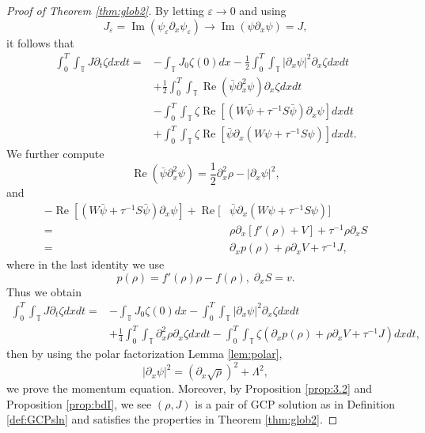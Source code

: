 \documentclass[leqno]{amsart}
\theoremstyle{plain}
\theoremstyle{definition}
\theoremstyle{remark}
\theoremstyle{plain}
\theoremstyle{plain}
\def\T{{\mathbb T}}%
\def\d{{\partial}}
\def\eps{\varepsilon}
\DeclareMathOperator{\RE}{Re}
\DeclareMathOperator{\IM}{Im}
\numberwithin{equation}{section}
\begin{document}
\begin{proof}[Proof of Theorem \ref{thm:glob2}]
By letting $\eps\to 0$ and using 
\[
J_\eps=\IM(\psi_\eps\d_x\psi_\eps)\to \IM(\psi\d_x\psi)=J,
\]
it follows that
\begin{align*}
\int_0^T\int_\T J \d_t\zeta dxdt=&-\int_\T J_0\zeta(0)dx-\frac12\int_0^T\int_\T|\d_x\psi|^2\d_x\zeta dxdt\\
&+\frac12\int_0^T\int_\T\RE(\bar\psi\d_x^2\psi)\d_x\zeta dxdt\\
&-\int_0^T\int_\T \zeta\RE[(W\bar\psi+\tau^{-1}S\bar\psi)\d_x\psi] dxdt\\
&+\int_0^T\int_\T \zeta\RE[\bar\psi\d_x(W\psi+\tau^{-1}S\psi)]dxdt.
\end{align*}
We further compute
\[
\RE(\bar\psi\d_x^2\psi)=\frac12\d_x^2\rho-|\d_x\psi|^2,
\]
and
\begin{align*}
-\RE[(W\bar\psi+\tau^{-1}S\bar\psi)\d_x\psi]+\RE[&\bar\psi\d_x(W\psi+\tau^{-1}S\psi)]\\
=&\rho\d_x [f'(\rho)+V]+\tau^{-1}\rho\d_xS\\
=&\d_xp(\rho)+\rho\d_xV+\tau^{-1}J,
\end{align*}
where in the last identity we use 
\[
p(\rho)=f'(\rho)\rho-f(\rho),\; \d_xS=v.
\]
Thus we obtain
\begin{align*}
\int_0^T\int_\T J \d_t\zeta dxdt=&-\int_\T J_0\zeta(0)dx-\int_0^T\int_\T|\d_x\psi|^2\d_x\zeta dxdt\\
&+\frac14\int_0^T\int_\T\d_x^2\rho\d_x\zeta dxdt-\int_0^T\int_\T \zeta (\d_xp(\rho)+\rho\d_xV+\tau^{-1}J)dxdt,
\end{align*}
then by using the polar factorization Lemma \ref{lem:polar},
\[
|\d_x\psi|^2=(\d_x\sqrt\rho)^2+\Lambda^2,
\]
we prove the momentum equation. Moreover, by Proposition \ref{prop:3.2} and Proposition \ref{prop:bdI}, we see $(\rho,J)$ is a pair of GCP solution as in Definition \ref{def:GCPsln} and satisfies the properties in Theorem \ref{thm:glob2}.


\end{proof}
\end{document}
